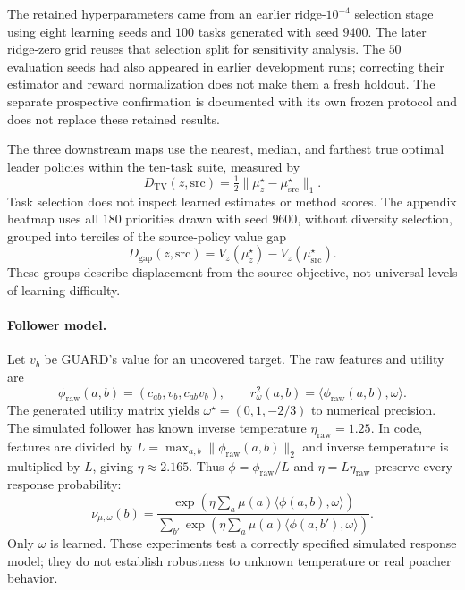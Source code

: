 The retained hyperparameters came from an earlier ridge-$10^{-4}$ selection
stage using eight learning seeds and $100$ tasks generated with seed $9400$.
The later ridge-zero grid reuses that selection split for sensitivity analysis.
The $50$ evaluation seeds had also appeared in earlier development runs;
correcting their estimator and reward normalization does not make them a fresh
holdout. The separate prospective confirmation is documented with its own frozen
protocol and does not replace these retained results.

The three downstream maps use the nearest, median, and farthest true optimal
leader policies within the ten-task suite, measured by
\begin{equation*}
D_{\mathrm{TV}}(z,\mathrm{src})=\tfrac12\lVert\mu_z^\star-\mu_{\mathrm{src}}^\star\rVert_1.
\end{equation*}
Task selection does not inspect learned estimates or method scores. The appendix
heatmap uses all $180$ priorities drawn with seed $9600$, without diversity
selection, grouped into terciles of the source-policy value gap
\begin{equation*}
D_{\mathrm{gap}}(z,\mathrm{src})=V_z(\mu_z^\star)-V_z(\mu_{\mathrm{src}}^\star).
\end{equation*}
These groups describe displacement from the source objective, not universal
levels of learning difficulty.

\paragraph{Follower model.}
Let $v_b$ be GUARD's value for an uncovered target. The raw features and utility are
\begin{equation*}
\phi_{\mathrm{raw}}(a,b)=(c_{ab},v_b,c_{ab}v_b),\qquad r^2_\omega(a,b)=\langle\phi_{\mathrm{raw}}(a,b),\omega\rangle.
\end{equation*}
The generated utility matrix yields $\omega^\star=(0,1,-2/3)$ to numerical
precision. The simulated follower has known inverse temperature
$\eta_{\mathrm{raw}}=1.25$. In code, features are divided by
$L=\max_{a,b}\lVert\phi_{\mathrm{raw}}(a,b)\rVert_2$ and inverse temperature is
multiplied by $L$, giving $\eta\approx2.165$. Thus $\phi=\phi_{\mathrm{raw}}/L$
and $\eta=L\eta_{\mathrm{raw}}$ preserve every response probability:
\begin{equation*}
\nu_{\mu,\omega}(b)=\frac{\exp(\eta\sum_a\mu(a)\langle\phi(a,b),\omega\rangle)}{\sum_{b'}\exp(\eta\sum_a\mu(a)\langle\phi(a,b'),\omega\rangle)}.
\end{equation*}
Only $\omega$ is learned. These experiments test a correctly specified simulated
response model; they do not establish robustness to unknown temperature or
real poacher behavior.
